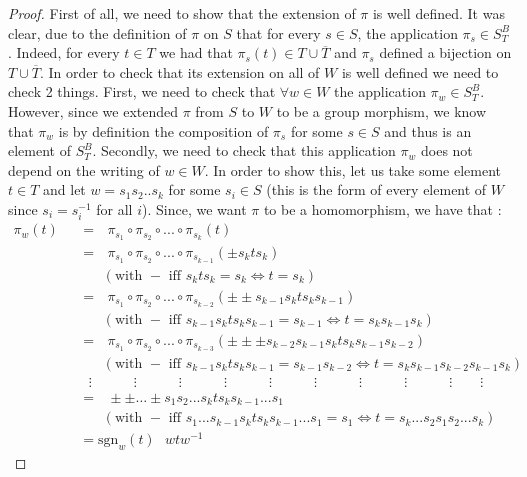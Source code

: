 \documentclass[envcountsame,envcountchap]{svmono}
\newcommand{\ub}[1]{\overline{#1}}
\newcommand{\q}{\quad}
\newcommand{\qq}{\text{ }}
\begin{document}
	\begin{proof}
		First of all, we need to show that the extension of $\pi$ is well defined. It was clear, due to the definition of $\pi$ on $S$ that for every $s\in S$, the application $\pi_s\in S^B_T$. Indeed, for every $t\in T$ we had that $\pi_s(t)\in T\cup \ub{T}$ and $\pi_s$ defined a bijection on $T\cup \ub{T}$. In order to check that its extension on all of $W$ is well defined we need to check 2 things. First, we need to check that $\forall w\in W$ the application $\pi_w\in S_T^B$. However, since we extended $\pi$ from $S$ to $W$ to be a group morphism, we know that $\pi_w$ is by definition the composition of $\pi_s$ for some $s\in S$ and thus is an element of $S_T^B$. Secondly, we need to check that this application $\pi_w$ does not depend on the writing of $w\in W$. In order to show this, let us take some element $t\in T$ and let $w=s_1s_2..s_k$ for some $s_i\in S$ (this is the form of every element of $W$ since $s_i=s_i^{-1}$ for all $i$). Since, we want $\pi$ to be a homomorphism, we have that :
		\begin{equation}\label{equation donnant la form explicite de pi}
		\begin{split}
		\pi_w(t)\qq&=\qq \pi_{s_1}\circ\pi_{s_2}\circ ... \circ \pi_{s_k}(t)\\
		&=\qq \pi_{s_1}\circ\pi_{s_2}\circ ... \circ \pi_{s_{k-1}}(\pm s_kts_k)\q\q\\
		& \q\qq (\mbox{with }-\mbox{ iff }s_kts_k=s_k\iff t=s_k)\\
		&=\qq \pi_{s_1}\circ\pi_{s_2}\circ ... \circ \pi_{s_{k-2}}(\pm\pm s_{k-1}s_kts_ks_{k-1})\q\q\\
		& \q\qq(\mbox{with }-\mbox{ iff }s_{k-1}s_kts_ks_{k-1}=s_{k-1}\iff t=s_ks_{k-1}s_k)\\
		&=\qq \pi_{s_1}\circ\pi_{s_2}\circ ... \circ \pi_{s_{k-3}}(\pm\pm\pm s_{k-2}s_{k-1}s_kts_ks_{k-1}s_{k-2})\q\q \\
		&\q\qq (\mbox{with }-\mbox{ iff }s_{k-1}s_kts_ks_{k-1}=s_{k-1}s_{k-2}\iff t=s_ks_{k-1}s_{k-2}s_{k-1}s_k)\\
		&\qq \vdots\q\q \q\vdots\q\q \q\vdots\q\q \q\vdots\q\q \q\vdots\q\q \q\vdots\q\q \q\vdots\q\q \q\vdots\q\q \q\vdots\q\q \vdots\\
		&=\qq \pm\pm \dots \pm s_1s_2...s_kts_ks_{k-1}... s_1\q\q\\
		& \q\qq (\mbox{with }-\mbox{ iff }s_1...s_{k-1}s_kts_ks_{k-1}...s_1=s_{1}\iff t=s_k...s_2s_1s_2...s_k)\\
		&=\mbox{sgn}_w(t)\qq wtw^{-1}
		\end{split}

\end{equation}
\end{proof}
\end{document}
